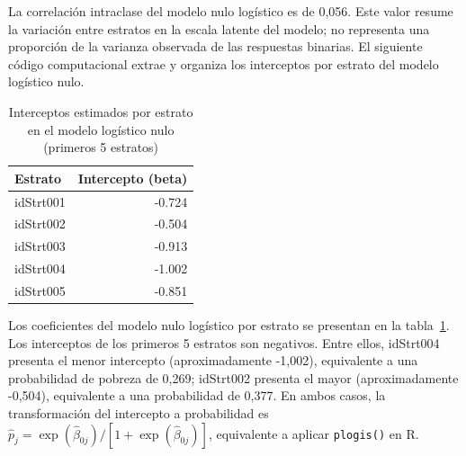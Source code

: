 \documentclass[
  spanish,
  11pt,
  letterpaper,
  oneside,
  open=any]{scrbook}
\newenvironment{Shaded}{\begin{snugshade}}{\end{snugshade}}
\newcommand{\AttributeTok}[1]{\textcolor[rgb]{0.40,0.45,0.13}{#1}}
\newcommand{\DecValTok}[1]{\textcolor[rgb]{0.68,0.00,0.00}{#1}}
\newcommand{\FunctionTok}[1]{\textcolor[rgb]{0.28,0.35,0.67}{#1}}
\newcommand{\NormalTok}[1]{\textcolor[rgb]{0.00,0.23,0.31}{#1}}
\newcommand{\OtherTok}[1]{\textcolor[rgb]{0.00,0.23,0.31}{#1}}
\newcommand{\SpecialCharTok}[1]{\textcolor[rgb]{0.37,0.37,0.37}{#1}}
\newcommand{\StringTok}[1]{\textcolor[rgb]{0.13,0.47,0.30}{#1}}
\begin{document}
La correlación intraclase del modelo nulo logístico es de 0,056. Este
valor resume la variación entre estratos en la escala latente del
modelo; no representa una proporción de la varianza observada de las
respuestas binarias. El siguiente código computacional extrae y organiza
los interceptos por estrato del modelo logístico nulo.

\begin{Shaded}
\end{Shaded}

{

\begin{longtable}[]{@{}lr@{}}

\caption{\label{tbl-coef-logit-nulo}Interceptos estimados por estrato en
el modelo logístico nulo (primeros 5 estratos)}

\tabularnewline

\toprule\noalign{}
Estrato & Intercepto (beta) \\
\midrule\noalign{}
\endhead
\bottomrule\noalign{}
\endlastfoot
idStrt001 & -0.724 \\
idStrt002 & -0.504 \\
idStrt003 & -0.913 \\
idStrt004 & -1.002 \\
idStrt005 & -0.851 \\

\end{longtable}

}

Los coeficientes del modelo nulo logístico por estrato se presentan en
la tabla~\ref{tbl-coef-logit-nulo}. Los interceptos de los primeros 5
estratos son negativos. Entre ellos, idStrt004 presenta el menor
intercepto (aproximadamente -1,002), equivalente a una probabilidad de
pobreza de 0,269; idStrt002 presenta el mayor (aproximadamente -0,504),
equivalente a una probabilidad de 0,377. En ambos casos, la
transformación del intercepto a probabilidad es
\(\hat p_j=\exp(\hat\beta_{0j})/[1+\exp(\hat\beta_{0j})]\), equivalente
a aplicar \texttt{plogis()} en R.
\end{document}
